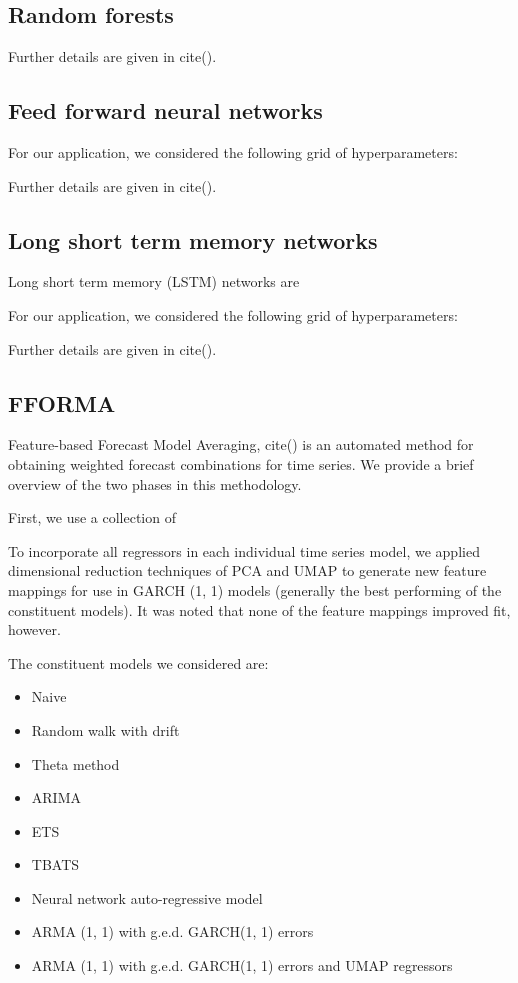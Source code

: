 \documentclass{article}
\begin{document}
\subsection{Random forests}

Further details are given in cite().

\subsection{Feed forward neural networks}


For our application, we considered the following grid of hyperparameters:



Further details are given in cite().

\subsection{Long short term memory networks}
Long short term memory (LSTM) networks are 

For our application, we considered the following grid of hyperparameters:

Further details are given in cite().

\subsection{FFORMA}
Feature-based Forecast Model Averaging, cite() is an automated method for obtaining weighted forecast combinations for time series. We provide a brief overview of the two phases in this methodology.

First, we use a collection of 

To incorporate all regressors in each individual time series model, we applied dimensional reduction techniques of PCA and UMAP to generate new feature mappings for use in GARCH (1, 1) models (generally the best performing of the constituent models). It was noted that none of the feature mappings improved fit, however.

The constituent models we considered are:
\begin{itemize}
	\item Naive
	\item Random walk with drift
	\item Theta method
	\item ARIMA
	\item ETS
	\item TBATS
	\item Neural network auto-regressive model
	\item ARMA (1, 1) with g.e.d. GARCH(1, 1) errors
	\item ARMA (1, 1) with g.e.d. GARCH(1, 1) errors and UMAP regressors
\end{itemize}
\end{document}
